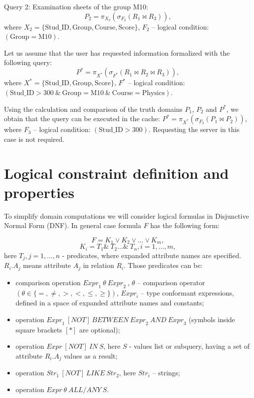 \documentclass[preprint,12pt]{elsarticle}
\def \n #1{\mathit{#1}}
\begin{document}
Query 2: Examination sheets of the group M10:
$$P_2 = \pi_{X_2}(\sigma_{F_2} (R_1 \Join R_3)),$$
where
$X_2 = \{\text{Stud\_ID}, \text{Group}, \text{Course}, \text{Score}\}$, $F_2$
-- logical condition:\\
$(\text{Group}=\text{M10})$.

Let us assume that the user has requested information formalized with the
following query:
$$P^{\ast} = \pi_{X^{\ast}}(\sigma_{F^{\ast}} (R_1 \Join R_2 \Join R_3 )),$$
where $X^{\ast}= \{\text{Stud\_ID}, \text{Group}, \text{Score}\}$, $F^{\ast}$
-- logical condition: $(\text{Stud\_ID} > 300\ \&\ \text{Group} =
\text{M10}\ \&\ \text{Course} = \text{Physics})$.

Using the calculation and comparison of the truth domains $P_1$, $P_2$ and
$P^{\ast}$, we obtain that the query can be executed in the cache:
$P^{\ast} =\pi_{X^{\ast}}(\sigma_{F_3} (P_1 \Join P_2 ))$, where $F_3$
-- logical condition: $(\text{Stud\_ID} > 300)$. Requesting the server in this
case is not required.


\section{Logical constraint definition and properties}
To simplify domain computations we will consider logical formulas in
Disjunctive Normal Form (DNF). In general case formula $F$ has the following
form:

\begin{equation}
F = K_1 \vee K_2 \vee \dots \vee K_m ,
\label{def_F_1}
\end{equation}
\begin{equation}
K_i = T_1 \&\ T_2 \dots \&\ T_n, i = 1, \dots, m ,
\label{def_F_2}
\end{equation}
here $T_j, j = 1, \dots, n$ - predicates, where expanded attribute names are
specified. $R_i.A_j$ means attribute $A_j$ in relation $R_i$.
Those predicates can be:
\begin{itemize}
\item comparison operation $ \n{Expr}_1\ \theta\ \n{Expr}_2\ $, $\theta$
-- comparison operator $(\theta \in \{=, \neq, >, <, \leq, \geq\})$,
$\n{Expr}_i$ -- type conformant expressions, defined in a space of expanded
attribute names and constants;
\item operation $\n{Expr}_1\ \n{[NOT]}\ \n{BETWEEN}\ \n{Expr}_2\ \n{AND}\
\n{Expr}_3$
(symbols inside square brackets $[*]$ are optional);
\item operation $\n{Expr}\ \n{[NOT]}\ \n{IN}\ S$, here $S$ - values list or
subquery, having a set of attribute $R_i.A_j$ values as a result;
\item operation $\n{Str}_1\ \n{[NOT]}\ \n{LIKE}\ \n{Str}_2$, here $\n{Str}_i$
-- strings;
\item operation $\n{Expr}\ \theta\ \n{ALL/ANY}\ S$.
\end{itemize}
\end{document}
